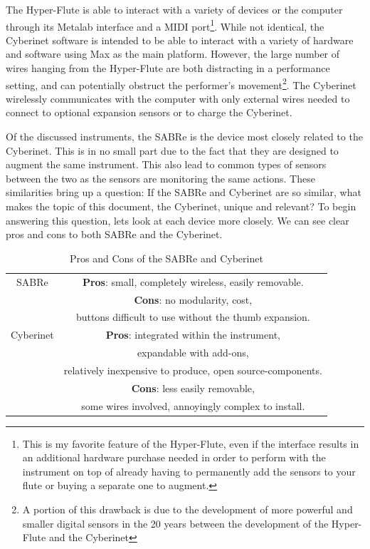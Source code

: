 The Hyper-Flute is able to interact with a variety of devices or the computer through its Metalab interface and a MIDI port\footnote{This is my favorite feature of the Hyper-Flute, even if the interface results in an additional hardware purchase needed in order to perform with the instrument on top of already having to permanently add the sensors to your flute or buying a separate one to augment.}. While not identical, the Cyberinet software is intended to be able to interact with a variety of hardware and software using Max as the main platform. However, the large number of wires hanging from the Hyper-Flute are both distracting in a performance setting, and can potentially obstruct the performer's movement\footnote{A portion of this drawback is due to the development of more powerful and smaller digital sensors in the 20 years between the development of the Hyper-Flute and the Cyberinet}. The Cyberinet wirelessly communicates with the computer with only external wires needed to connect to optional expansion sensors or to charge the Cyberinet.


Of the discussed instruments, the SABRe is the device most closely related to the Cyberinet. This is in no small part due to the fact that they are designed to augment the same instrument. This also lead to common types of sensors between the two as the sensors are monitoring the same actions. These similarities bring up a question: If the SABRe and Cyberinet are so similar, what makes the topic of this document, the Cyberinet, unique and relevant? To begin answering this question, lets look at each device more closely. We can see clear pros and cons to both SABRe and the Cyberinet.



\begin{table}[]
    \centering
    \begin{tabular}{|c||c|}
    \hline
     SABRe & \textbf{Pros}: small, completely wireless, easily removable. \\
         & \textbf{Cons}: no modularity, cost, \\
         & buttons difficult to use without the thumb expansion.\\
    Cyberinet & \textbf{Pros}: integrated within the instrument,\\
    & expandable with add-ons,\\ 
    & relatively inexpensive to produce, open source-components.\\
    & \textbf{Cons}: less easily removable, \\
    & some wires involved, annoyingly complex to install.
    \hline
    \end{tabular}
    \caption{Pros and Cons of the SABRe and Cyberinet}
    \label{tab:sabreCyberinetProCons}
\end{table}



